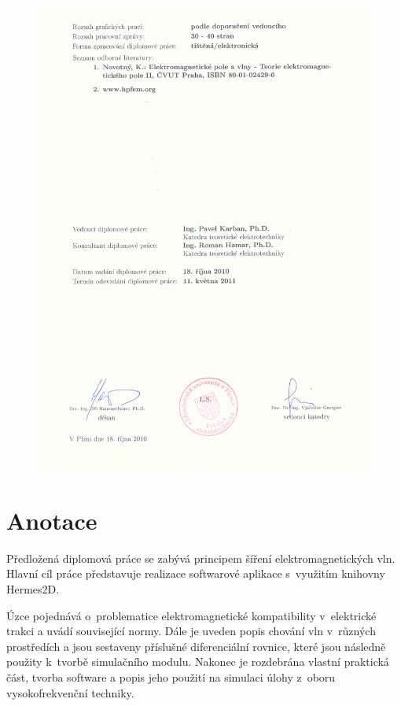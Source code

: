 \begin{figure}[!h]
	\centering
	\includegraphics[width=15cm]{zadani2.png}
\end{figure}
\newpage

\section*{Anotace}
Předložená diplomová práce se zabývá principem šíření elektromagnetických vln. Hlavní cíl práce představuje realizace softwarové aplikace s~využitím knihovny Hermes2D.

Úzce pojednává o~problematice elektromagnetické kompatibility v~elektrické trakci a uvádí související normy. Dále je uveden popis chování vln v~různých prostředích a jsou sestaveny příslušné diferenciální rovnice, které jsou následně použity k~tvorbě simulačního modulu.  Nakonec je rozdebrána vlastní praktická část, tvorba software a popis jeho použití na simulaci úlohy z~oboru vysokofrekvenční techniky.

